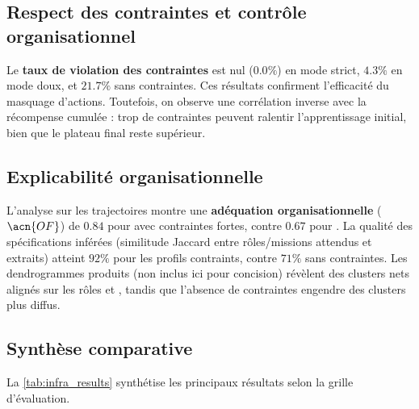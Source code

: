 \subsection*{Respect des contraintes et contrôle organisationnel}

Le \textbf{taux de violation des contraintes} est nul ($0.0\%$) en mode strict, $4.3\%$ en mode doux, et $21.7\%$ sans contraintes.
Ces résultats confirment l'efficacité du masquage d'actions.
Toutefois, on observe une corrélation inverse avec la récompense cumulée : trop de contraintes peuvent ralentir l'apprentissage initial, bien que le plateau final reste supérieur.

\subsection*{Explicabilité organisationnelle}

L'analyse  sur les trajectoires montre une \textbf{adéquation organisationnelle} ($\acn{OF}$) de $0.84$ pour  avec contraintes fortes, contre $0.67$ pour .
La qualité des spécifications inférées (similitude Jaccard entre rôles/missions attendus et extraits) atteint $92\%$ pour les profils contraints, contre $71\%$ sans contraintes.
Les dendrogrammes produits (non inclus ici pour concision) révèlent des clusters nets alignés sur les rôles  et , tandis que l'absence de contraintes engendre des clusters plus diffus.

\subsection*{Synthèse comparative}

La \autoref{tab:infra_results} synthétise les principaux résultats selon la grille d'évaluation.

